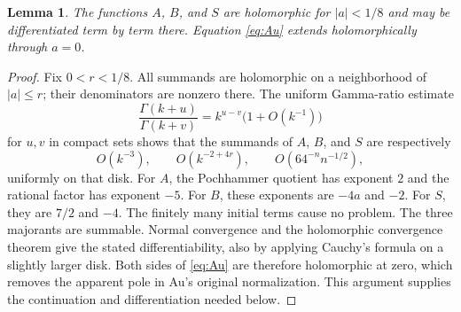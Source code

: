 \documentclass[11pt]{article}
\newtheorem{lemma}[theorem]{Lemma}
\begin{document}
\begin{lemma}\label{lem:analytic}
The functions $A$, $B$, and $S$ are holomorphic for $|a|<1/8$ and may
be differentiated term by term there. Equation \eqref{eq:Au} extends
holomorphically through $a=0$.
\end{lemma}
\begin{proof}
Fix $0<r<1/8$. All summands are holomorphic on a neighborhood of
$|a|\leq r$; their denominators are nonzero there. The uniform Gamma-ratio
estimate
\[
 \frac{\Gamma(k+u)}{\Gamma(k+v)}
 =k^{u-v}\bigl(1+O(k^{-1})\bigr)
\]
for $u,v$ in compact sets shows that the summands of $A$, $B$, and $S$
are respectively
\[
 O(k^{-3}),\qquad O(k^{-2+4r}),\qquad
 O(64^{-n}n^{-1/2}),
\]
uniformly on that disk. For $A$, the Pochhammer quotient has exponent
$2$ and the rational factor has exponent $-5$. For $B$, these exponents
are $-4a$ and $-2$. For $S$, they are $7/2$ and $-4$.
The finitely many initial terms cause no problem. The three majorants
are summable. Normal convergence and the holomorphic convergence theorem
give the stated differentiability, also by applying Cauchy's formula
on a slightly larger disk. Both sides of \eqref{eq:Au} are therefore
holomorphic at zero, which removes the apparent pole in Au's original
normalization. This argument supplies the continuation and
differentiation needed below.
\end{proof}
\end{document}
